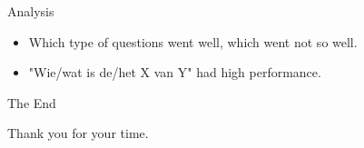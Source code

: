 \documentclass[pdf]{beamer}
\begin{document}
  \begin{frame}{Analysis}
    \begin{itemize}
      \item Which type of questions went well, which went not so well.
      \item "Wie/wat is de/het X van Y" had high performance.
    \end{itemize}
  \end{frame}

  \begin{frame}{The End}
    \begin{center}
      Thank you for your time.
    \end{center}
  \end{frame}
\end{document}
